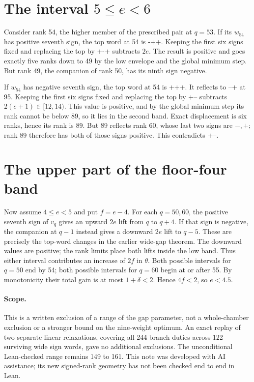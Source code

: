 \documentclass[11pt,letterpaper]{article}
\begin{document}
\section*{The interval \(5\le e<6\)}
Consider rank 54, the higher member of the prescribed pair
at \(q=53\). If its \(w_{54}\) has positive seventh sign,
the top word at 54 is \(\texttt{-++}\). Keeping the first six
signs fixed and replacing the top by \(\texttt{+-+}\) subtracts
\(2e\). The result is positive and goes exactly five ranks
down to 49 by the low envelope and the global minimum step.
But rank 49, the companion of rank 50, has its ninth sign
negative.

If \(w_{54}\) has negative seventh sign, the top word at
54 is \(\texttt{+++}\). It reflects to \(\texttt{--+}\) at 95.
Keeping the first six signs fixed and replacing the top
by \(\texttt{+--}\) subtracts \(2(e+1)\in[12,14)\).
This value is positive, and by the global minimum step its
rank cannot be below 89, so it lies in the second band.
Exact displacement is six ranks, hence its rank is 89.
But 89 reflects rank 60, whose last two signs are \(-,+\);
rank 89 therefore has both of those signs positive. This
contradicts \(\texttt{+--}\).

\section*{The upper part of the floor-four band}
Now assume \(4\le e<5\) and put \(f=e-4\). For each
\(q=50,60\), the positive seventh sign of \(v_q\) gives an
upward \(2e\) lift from \(q\) to \(q+4\). If that sign is
negative, the companion at \(q-1\) instead gives a downward
\(2e\) lift to \(q-5\). These are precisely the top-word
changes in the earlier wide-gap theorem. The downward
values are positive; the rank limits place both lifts
inside the low band. Thus either interval contributes
an increase of \(2f\) in \(\theta\). Both possible intervals
for \(q=50\) end by 54; both possible intervals for \(q=60\)
begin at or after 55. By monotonicity their total gain
is at most \(1+\delta<2\). Hence \(4f<2\), so \(e<4.5\).

\paragraph{Scope.}
This is a written exclusion of a range of the gap parameter,
not a whole-chamber exclusion or a stronger bound on the
nine-weight optimum. An exact replay of two separate linear relaxations, covering all
244 branch duties across 122 surviving wide sign words, gave no
additional exclusions. The unconditional Lean-checked range
remains 149 to 161. This note was developed with AI assistance;
its new signed-rank geometry has not been checked end to end
in Lean.
\end{document}
